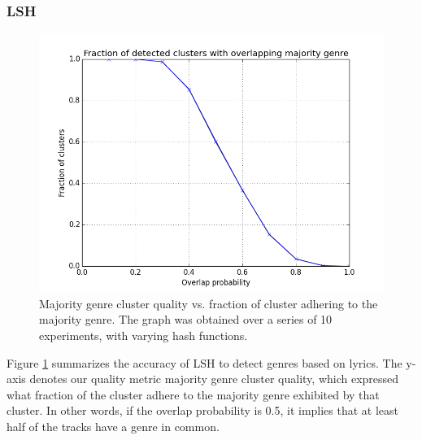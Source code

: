 \documentclass[10pt,a4paper]{scrartcl}
\begin{document}
      \subsubsection{LSH}
      \begin{figure}[htbp]
 	\centering
	 \includegraphics[scale=0.5]{img/lsh_maj_prob.png}
 	\caption{Majority genre cluster quality vs. fraction of cluster adhering to the majority genre. The graph was obtained over a series of 10 experiments, with varying hash functions.}
	 \label{figure:lsh_res}
      \end{figure}
	 
      Figure \ref{figure:lsh_res} summarizes the accuracy of LSH to detect genres based on lyrics.
      The y-axis denotes our quality metric majority genre cluster quality, which expressed what fraction of the cluster adhere to the majority genre exhibited by that cluster.
      In other words, if the overlap probability is 0.5, it implies that at least half of the tracks have a genre in common.
  
  
\end{document}
